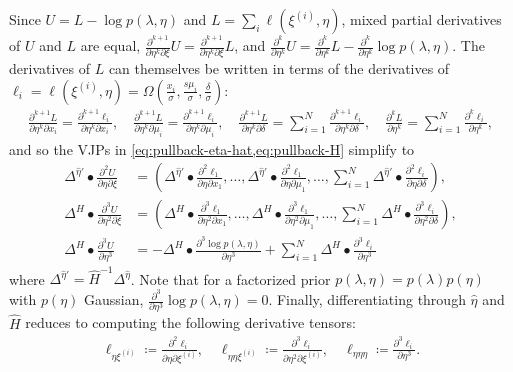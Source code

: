 \documentclass{article}
\begin{document}
Since $U = L - \log p(\lambda, \eta)$ and $L = \sum_i \ell(\xi^{(i)}, \eta)$, mixed partial derivatives of $U$ and $L$ are equal, $\frac{\partial^{k+1}}{\partial \eta^k \partial \xi} U = \frac{\partial^{k+1}}{\partial \eta^k \partial \xi} L$, and $\frac{\partial^k}{\partial \eta^k} U = \frac{\partial^k}{\partial \eta^k} L - \frac{\partial^k}{\partial \eta^k} \log p(\lambda, \eta)$.
The derivatives of $L$ can themselves be written in terms of the derivatives of $\ell_i = \ell(\xi^{(i)}, \eta) = \Omega(\frac{x_i}{\sigma}, \frac{s \mu_i}{\sigma}, \frac{\delta}{\sigma})$:
%
\begin{align}
  \frac{\partial^{k+1} L}{\partial \eta^k \partial x_i} = \frac{\partial^{k+1} \ell_i}{\partial \eta^k \partial x_i},
  \quad
  \frac{\partial^{k+1} L}{\partial \eta^k \partial \mu_i} = \frac{\partial^{k+1} \ell_i}{\partial \eta^k \partial \mu_i},
  \quad
  \frac{\partial^{k+1} L}{\partial \eta^k \partial \delta} = \sum_{i=1}^N \frac{\partial^{k+1} \ell_i}{\partial \eta^k \partial \delta},
  \quad
  \frac{\partial^{k} L}{\partial \eta^{k}} = \sum_{i=1}^N \frac{\partial^{k} \ell_i}{\partial \eta^{k}},
\end{align}
%
and so the VJPs in \cref{eq:pullback-eta-hat,eq:pullback-H} simplify to
%
\begin{align}
  \Delta^{\hat{\eta}'} \bullet \frac{\partial^2 U}{\partial \eta \partial \xi} & = \left( \Delta^{\hat{\eta}'} \bullet \frac{\partial^2 \ell_1}{\partial \eta \partial x_1}, \ldots, \Delta^{\hat{\eta}'} \bullet \frac{\partial^2 \ell_1}{\partial \eta \partial \mu_1}, \ldots, \sum_{i=1}^N \Delta^{\hat{\eta}'} \bullet \frac{\partial^2 \ell_i}{\partial \eta \partial \delta} \right), \label{eq:pullback-eta-hat-simplified} \\
  \Delta^H \bullet \frac{\partial^3 U}{\partial \eta^2 \partial \xi}           & = \left( \Delta^H \bullet \frac{\partial^3 \ell_1}{\partial \eta^2 \partial x_1}, \ldots, \Delta^H \bullet \frac{\partial^3 \ell_1}{\partial \eta^2 \partial \mu_1}, \ldots, \sum_{i=1}^N \Delta^H \bullet \frac{\partial^3 \ell_i}{\partial \eta^2 \partial \delta} \right), \label{eq:pullback-H-Phi-eta-squared-simplified}                     \\
  \Delta^H \bullet \frac{\partial^3 U}{\partial \eta^3}                        & = -\Delta^H \bullet \frac{\partial^3 \log p(\lambda, \eta)}{\partial \eta^3} + \sum_{i=1}^N \Delta^H \bullet \frac{\partial^3 \ell_i}{\partial \eta^3} \label{eq:pullback-H-eta-cubed-simplified}
\end{align}
%
where $\Delta^{\hat{\eta}'} = \hat{H}^{-1} \Delta^{\hat{\eta}}$.
Note that for a factorized prior $p(\lambda, \eta) = p(\lambda) p(\eta)$ with $p(\eta)$ Gaussian, $\frac{\partial^3}{\partial \eta^3} \log p(\lambda, \eta) = 0$.
Finally, differentiating through $\hat{\eta}$ and $\hat{H}$ reduces to computing the following derivative tensors:
%
\begin{align}\label{eq:ell-derivative-tensors}
  \ell_{\eta \xi^{(i)}} \coloneqq \frac{\partial^2 \ell_i}{\partial \eta \partial \xi^{(i)}},
  \quad
  \ell_{\eta \eta \xi^{(i)}} \coloneqq \frac{\partial^3 \ell_i}{\partial \eta^2 \partial \xi^{(i)}},
  \quad
  \ell_{\eta \eta \eta} \coloneqq \frac{\partial^3 \ell_i}{\partial \eta^3}.
\end{align}
\end{document}
